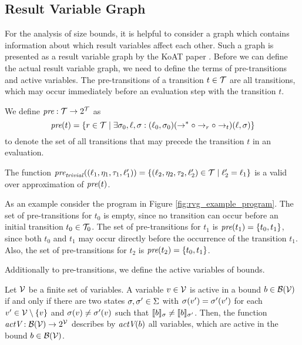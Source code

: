 \subsection{Result Variable Graph}

For the analysis of size bounds, it is helpful to consider a graph which contains information about which result variables affect each other.
Such a graph is presented as a result variable graph by the KoAT paper \cite{koat}.
Before we can define the actual result variable graph, we need to define the terms of pre-transitions and active variables.
The pre-transitions of a transition $t \in \mathcal{T}$ are all transitions, which may occur immediately before an evaluation step with the transition $t$.

\begin{definition} 
  We define $\emph{pre}: \mathcal{T} \rightarrow 2^{\mathcal{T}}$ as
  \[\emph{pre}(t) = \lbrace r \in \mathcal{T} \mid \exists \sigma_0, \ell, \sigma: (\ell_0, \sigma_0) (\rightarrow^* \circ \rightarrow_r \circ \rightarrow_{t}) (\ell, \sigma) \rbrace\]
  to denote the set of all transitions that may precede the transition $t$ in an evaluation.	
\end{definition}

The function $\emph{pre}_{\mathit{trivial}}((\ell_1, \eta_1, \tau_1, \ell_1')) = \lbrace (\ell_2, \eta_2, \tau_2, \ell_2') \in \mathcal{T} \mid \ell_2' = \ell_1 \rbrace$ is a valid over approximation of $\emph{pre}(t)$.



As an example consider the program in Figure \ref{fig:rvg_example_program}.
The set of pre-transitions for $t_0$ is empty, since no transition can occur before an initial transition $t_0 \in \mathcal{T}_0$.
The set of pre-transitions for $t_1$ is $\emph{pre}(t_1) = \lbrace t_0, t_1 \rbrace$, since both $t_0$ and $t_1$ may occur directly before the occurrence of the transition $t_1$.
Also, the set of pre-transitions for $t_2$ is $\emph{pre}(t_2) = \lbrace t_0, t_1 \rbrace$.

Additionally to pre-transitions, we define the active variables of bounds. 

\begin{definition}
  Let $\mathcal{V}$ be a finite set of variables.  
  A variable $v \in \mathcal{V}$ is active in a bound $b \in \mathcal{B}(\mathcal{V})$ if and only if there are two states $\sigma, \sigma' \in \Sigma$ with $\sigma(v') = \sigma'(v')$ for each $v' \in \mathcal{V} \setminus \lbrace v \rbrace$ and $\sigma(v) \neq \sigma'(v)$ such that $\llbracket b \rrbracket_{\sigma} \neq \llbracket b \rrbracket_{\sigma'}$.
  Then, the function $\emph{actV}: \mathcal{B}(\mathcal{V}) \rightarrow 2^{\mathcal{V}}$ describes by $\emph{actV}(b)$ all variables, which are active in the bound $b \in \mathcal{B}(\mathcal{V})$.
\end{definition}

